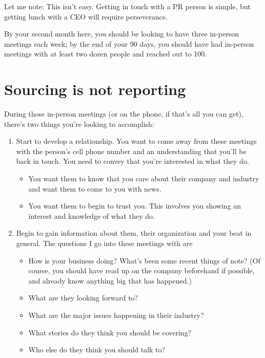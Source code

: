 \documentclass[
  11pt,
  american,
  letterpaperpaper,
  extrafontsizes,onecolumn,openright
  ]{memoir}
\providecommand{\tightlist}{%
  \setlength{\itemsep}{0pt}\setlength{\parskip}{0pt}}
\begin{document}
Let me note: This isn't easy. Getting in touch with a PR person is simple, but getting lunch with a CEO will require perseverance.

By your second month here, you should be looking to have three in-person meetings each week; by the end of your 90 days, you should have had in-person meetings with at least two dozen people and reached out to 100.

\hypertarget{sourcing-is-not-reporting}{%
\section*{Sourcing is not reporting}\label{sourcing-is-not-reporting}}

During those in-person meetings (or on the phone, if that's all you can get), there's two things you're looking to accomplish:

\begin{enumerate}
\def\labelenumi{\arabic{enumi}.}
\tightlist
\item
  Start to develop a relationship. You want to come away from these meetings with the person's cell phone number and an understanding that you'll be back in touch. You need to convey that you're interested in what they do.

  \begin{itemize}
  \tightlist
  \item
    You want them to know that you care about their company and industry and want them to come to you with news.
  \item
    You want them to begin to trust you. This involves you showing an interest and knowledge of what they do.
  \end{itemize}
\item
  Begin to gain information about them, their organization and your beat in general. The questions I go into these meetings with are

  \begin{itemize}
  \tightlist
  \item
    How is your business doing? What's been some recent things of note? (Of course, you should have read up on the company beforehand if possible, and already know anything big that has happened.)
  \item
    What are they looking forward to?
  \item
    What are the major issues happening in their industry?
  \item
    What stories do they think you should be covering?
  \item
    Who else do they think you should talk to?
  \end{itemize}
\end{enumerate}
\end{document}
